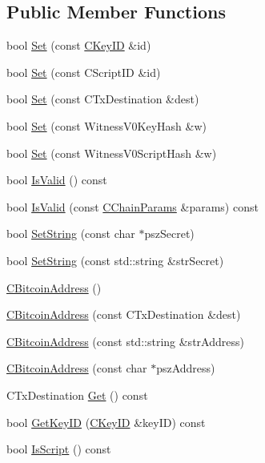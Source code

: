 \subsection*{Public Member Functions}
\begin{DoxyCompactItemize}
\item 
bool \mbox{\hyperlink{class_c_bitcoin_address_abe1614f9ecd143ae69256d65c5edbcab}{Set}} (const \mbox{\hyperlink{class_c_key_i_d}{C\+Key\+ID}} \&id)
\item 
bool \mbox{\hyperlink{class_c_bitcoin_address_abb974c40304444b0f14a005ddb7dac03}{Set}} (const C\+Script\+ID \&id)
\item 
bool \mbox{\hyperlink{class_c_bitcoin_address_a819dfc6a4866832e2cd2e51c1a245d80}{Set}} (const C\+Tx\+Destination \&dest)
\item 
bool \mbox{\hyperlink{class_c_bitcoin_address_a75482d6da08f0140ef677128f2300f8c}{Set}} (const Witness\+V0\+Key\+Hash \&w)
\item 
bool \mbox{\hyperlink{class_c_bitcoin_address_ae02c04381afaf58cdd8abbb6e6c9fb0e}{Set}} (const Witness\+V0\+Script\+Hash \&w)
\item 
bool \mbox{\hyperlink{class_c_bitcoin_address_ab39907ce6895062a8f8bf585270ef13b}{Is\+Valid}} () const
\item 
bool \mbox{\hyperlink{class_c_bitcoin_address_a0c6030891dae71881944f93774fa907e}{Is\+Valid}} (const \mbox{\hyperlink{class_c_chain_params}{C\+Chain\+Params}} \&params) const
\item 
bool \mbox{\hyperlink{class_c_bitcoin_address_a7ade462b7aff9b533c9886245471fec6}{Set\+String}} (const char $\ast$psz\+Secret)
\item 
bool \mbox{\hyperlink{class_c_bitcoin_address_a2a4b506cd579e075a954336d56db818f}{Set\+String}} (const std\+::string \&str\+Secret)
\item 
\mbox{\hyperlink{class_c_bitcoin_address_ae1870e2f346a1f9968a201864fbdf010}{C\+Bitcoin\+Address}} ()
\item 
\mbox{\hyperlink{class_c_bitcoin_address_a4c9c03791561557b8a1926567456712e}{C\+Bitcoin\+Address}} (const C\+Tx\+Destination \&dest)
\item 
\mbox{\hyperlink{class_c_bitcoin_address_a23f7116fe3a89ab9a551f1d8c29469da}{C\+Bitcoin\+Address}} (const std\+::string \&str\+Address)
\item 
\mbox{\hyperlink{class_c_bitcoin_address_ac0fd8d46f815948d471a8896997a3211}{C\+Bitcoin\+Address}} (const char $\ast$psz\+Address)
\item 
C\+Tx\+Destination \mbox{\hyperlink{class_c_bitcoin_address_a1e44de10dfc84d1fd2e15150f1e22b8e}{Get}} () const
\item 
bool \mbox{\hyperlink{class_c_bitcoin_address_af3d7c4547803b09144fc040320f687dd}{Get\+Key\+ID}} (\mbox{\hyperlink{class_c_key_i_d}{C\+Key\+ID}} \&key\+ID) const
\item 
bool \mbox{\hyperlink{class_c_bitcoin_address_a9547fc1ef7cfc2288904e7eedab57a10}{Is\+Script}} () const
\end{DoxyCompactItemize}
